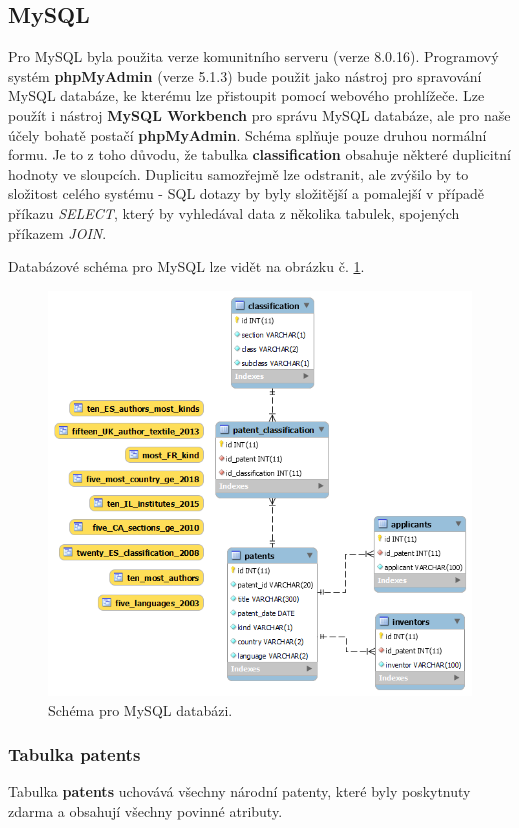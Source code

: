 \subsection{MySQL} \label{subsec:mysql_impl}
Pro MySQL byla použita verze komunitního serveru (verze 8.0.16). Programový systém \textbf{phpMyAdmin} (verze 5.1.3)  bude použit jako nástroj pro spravování MySQL databáze, ke kterému lze přistoupit pomocí webového prohlížeče. Lze použít i nástroj \textbf{MySQL Workbench} pro správu MySQL databáze, ale pro naše účely bohatě postačí \textbf{phpMyAdmin}.
\newline
\indent Schéma splňuje pouze druhou normální formu. Je to z toho důvodu, že tabulka \textbf{classification} obsahuje některé duplicitní hodnoty ve sloupcích. Duplicitu samozřejmě lze odstranit, ale zvýšilo by to složitost celého systému - \gls{SQL} dotazy by byly složitější a pomalejší v případě příkazu \textit{SELECT}, který by vyhledával data z několika tabulek, spojených příkazem \textit{JOIN}.
\newline

\noindent Databázové schéma pro MySQL lze vidět na obrázku č. \ref{fig:mysql_schema}.
\begin{figure}[H]
\centering
\includegraphics[width=12cm]{img/eer}
\caption{Schéma pro MySQL databázi.}
\label{fig:mysql_schema}
\end{figure}

\subsubsection{Tabulka patents}
Tabulka \textbf{patents} uchovává všechny národní patenty, které byly poskytnuty zdarma a obsahují všechny povinné atributy.

